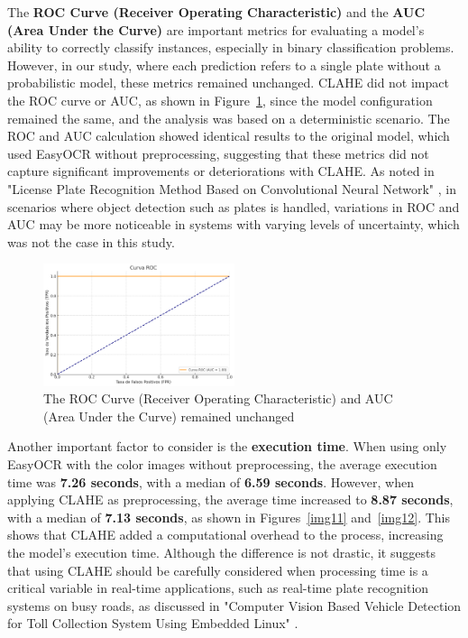 \documentclass[conference]{IEEEtran}
\begin{document}
    The \textbf{ROC Curve (Receiver Operating Characteristic)} and the \textbf{AUC (Area Under the Curve)} are important metrics for evaluating a model's ability to correctly classify instances, especially in binary classification problems. However, in our study, where each prediction refers to a single plate without a probabilistic model, these metrics remained unchanged. CLAHE did not impact the ROC curve or AUC, as shown in Figure~\ref{img10}, since the model configuration remained the same, and the analysis was based on a deterministic scenario. The ROC and AUC calculation showed identical results to the original model, which used EasyOCR without preprocessing, suggesting that these metrics did not capture significant improvements or deteriorations with CLAHE. As noted in "License Plate Recognition Method Based on Convolutional Neural Network" \cite{b14}, in scenarios where object detection such as plates is handled, variations in ROC and AUC may be more noticeable in systems with varying levels of uncertainty, which was not the case in this study.
    
    \begin{figure}[htbp]
        \centerline{\includegraphics[width=0.5\textwidth]{img10.png}}
        \caption{The ROC Curve (Receiver Operating Characteristic) and AUC (Area Under the Curve) remained unchanged}
        \label{img10}
    \end{figure}
    
    Another important factor to consider is the \textbf{execution time}. When using only EasyOCR with the color images without preprocessing, the average execution time was \textbf{7.26 seconds}, with a median of \textbf{6.59 seconds}. However, when applying CLAHE as preprocessing, the average time increased to \textbf{8.87 seconds}, with a median of \textbf{7.13 seconds}, as shown in Figures~\ref{img11} and~\ref{img12}. This shows that CLAHE added a computational overhead to the process, increasing the model's execution time. Although the difference is not drastic, it suggests that using CLAHE should be carefully considered when processing time is a critical variable in real-time applications, such as real-time plate recognition systems on busy roads, as discussed in "Computer Vision Based Vehicle Detection for Toll Collection System Using Embedded Linux" \cite{b16}.
    
\end{document}
